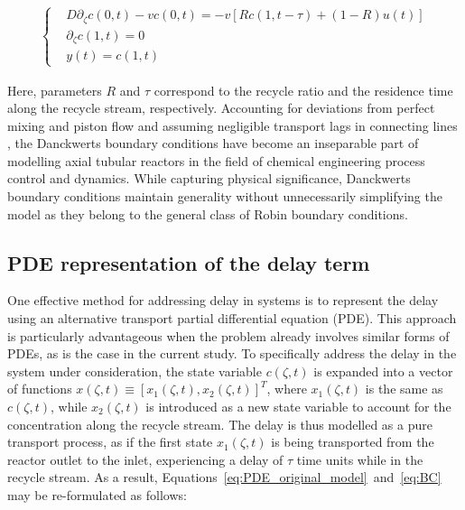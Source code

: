 \begin{align} \label{eq:BC}
    \begin{cases}
        &D \partial_\zeta c(0, t) - v c(0, t) = -v \left[ R c(1, t-\tau) + (1-R) u(t) \right] \\
        &\partial_\zeta c(1, t) = 0 \\
        &y(t) = c(1, t)
    \end{cases}
\end{align}

Here, parameters $R$ and $\tau$ correspond to the recycle ratio and the residence time along the recycle stream, respectively. Accounting for deviations from perfect mixing and piston flow and assuming negligible transport lags in connecting lines \autocite{Danckwerts1953Continuous}, the Danckwerts boundary conditions have become an inseparable part of modelling axial tubular reactors in the field of chemical engineering process control and dynamics. While capturing physical significance, Danckwerts boundary conditions maintain generality without unnecessarily simplifying the model as they belong to the general class of Robin boundary conditions.


\subsection{PDE representation of the delay term}

One effective method for addressing delay in systems is to represent the delay using an alternative transport partial differential equation (PDE). This approach is particularly advantageous when the problem already involves similar forms of PDEs, as is the case in the current study. To specifically address the delay in the system under consideration, the state variable $c(\zeta, t)$ is expanded into a vector of functions ${x}(\zeta, t) \equiv [x_1(\zeta, t), x_2(\zeta, t)]^T$, where $x_1(\zeta, t)$ is the same as $c(\zeta, t)$, while $x_2(\zeta, t)$ is introduced as a new state variable to account for the concentration along the recycle stream. The delay is thus modelled as a pure transport process, as if the first state $x_1(\zeta, t)$ is being transported from the reactor outlet to the inlet, experiencing a delay of $\tau$ time units while in the recycle stream. As a result, Equations~\ref{eq:PDE_original_model}~and~\ref{eq:BC} may be re-formulated as follows:

